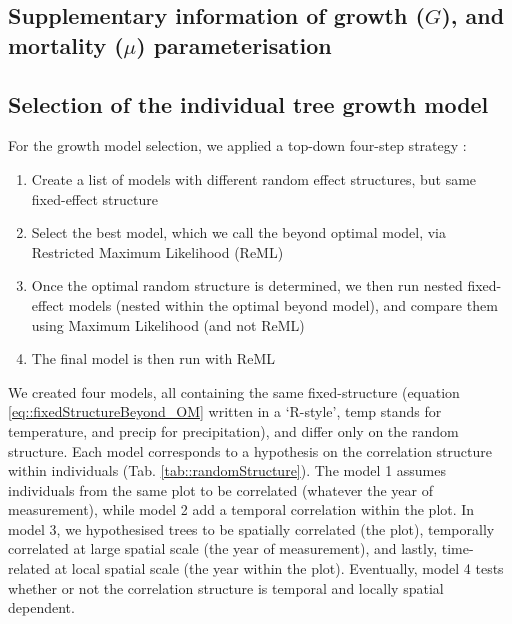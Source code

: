 \documentclass[letterpaper, 12pt]{article}
\theoremstyle{theo}
\begin{document}
\tableofcontents

\begin{refsection}
\begin{onehalfspace}

\section{Supplementary information of growth ($ G $), and mortality ($ \mu $) parameterisation} \label{app::glmm}
\subsection{Selection of the individual tree growth model}
For the growth model selection, we applied a top-down four-step strategy \citep[Chapter 5]{Zuur2009}:
\begin{enumerate}
	\item Create a list of models with different random effect structures, but same fixed-effect structure
	\item Select the best model, which we call the beyond optimal model, via Restricted Maximum Likelihood (ReML)
	\item Once the optimal random structure is determined, we then run nested fixed-effect models (nested within the optimal beyond model), and compare them using Maximum Likelihood (and not ReML)
	\item The final model is then run with ReML
\end{enumerate}

We created four models, all containing the same fixed-structure (equation \eqref{eq::fixedStructureBeyond_OM} written in a `R-style', temp stands for temperature, and precip for precipitation), and differ only on the random structure. Each model corresponds to a hypothesis on the correlation structure within individuals (Tab. \ref{tab::randomStructure}). The model 1 assumes individuals from the same plot to be correlated (whatever the year of measurement), while model 2 add a temporal correlation within the plot. In model 3, we hypothesised trees to be spatially correlated (the plot), temporally correlated at large spatial scale (the year of measurement), and lastly, time-related at local spatial scale (the year within the plot). Eventually, model 4 tests whether or not the correlation structure is temporal and locally spatial dependent.


\end{onehalfspace}
\end{refsection}
\end{document}
